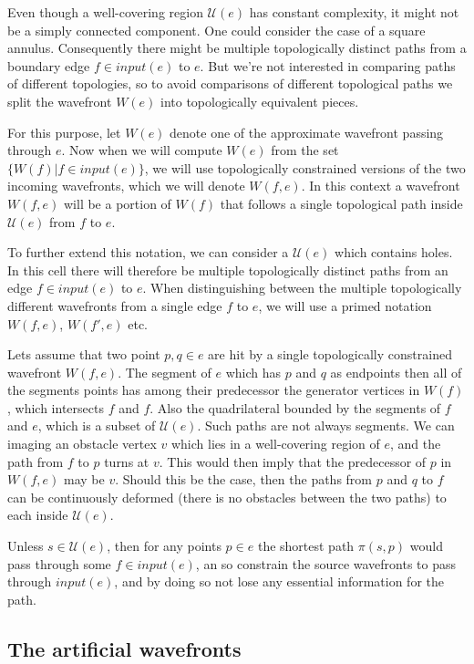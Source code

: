 Even though a well-covering region $\mathcal{U}(e)$ has constant complexity, it might not be 
a simply connected component. One could consider the case of a square annulus. Consequently 
there might be multiple topologically distinct paths from a boundary edge $f \in input(e)$ 
to $e$. But we're not interested in comparing paths of different topologies, so to avoid 
comparisons of different topological paths we split the wavefront $W(e)$ into topologically 
equivalent pieces. 

For this purpose, let $W(e)$ denote one of the approximate wavefront passing through $e$. Now 
when we will compute $W(e)$ from the set $\{W(f)|f \in input(e)\}$, we will use topologically 
constrained versions of the two incoming wavefronts, which we will denote $W(f,e)$. In this 
context a wavefront $W(f,e)$ will be a portion of $W(f)$ that follows a single topological 
path inside $\mathcal{U}(e)$ from $f$ to $e$.

To further extend this notation, we can consider a $\mathcal{U}(e)$ which contains holes. 
In this cell there will therefore be multiple topologically distinct paths from an edge $f 
\in input(e)$ to $e$. When distinguishing between the multiple topologically different 
wavefronts from a single edge $f$ to $e$, we will use a primed notation $W(f,e)$, $W(f',e)$ 
etc.

Lets assume that two point $p, q \in e$ are hit by a single topologically constrained 
wavefront $W(f,e)$. The segment of $e$ which has $p$ and $q$ as endpoints then all of the 
segments points has among their predecessor the generator vertices in $W(f)$, which 
intersects $f$ and $f$. Also the quadrilateral bounded by the segments of $f$ and $e$, which 
is a subset of $\mathcal{U}(e)$. Such paths are not always segments. We can imaging an 
obstacle vertex $v$ which lies in a well-covering region of $e$, and the path from $f$ to $p$ 
turns at $v$. This would then imply that the predecessor of $p$ in $W(f,e)$ may be $v$. 
Should this be the case, then the paths from $p$ and $q$ to $f$ can be continuously deformed 
(there is no obstacles between the two paths) to each inside $\mathcal{U}(e)$. 

Unless $s \in \mathcal{U}(e)$, then for any points $p \in e$ the shortest path $\pi(s,p)$ 
would pass through some $f \in input(e)$, an so constrain the source wavefronts to pass 
through $input(e)$, and by doing so not lose any essential information for the path.

\subsection{The artificial wavefronts}

